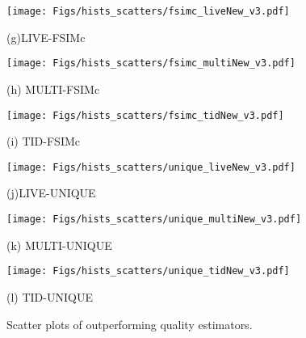 \documentclass[draftcls,12pt, onecolumn]{IEEEtran}
\begin{document}
\begin{center}
\begin{figure}[htbp!]
\begin{minipage}[b]{0.28\linewidth}
  \centering
\texttt{[image: Figs/hists\_scatters/fsimc\_liveNew\_v3.pdf]}
  \vspace{0.03cm}
  \centerline{\footnotesize{(g)LIVE-FSIMc}}\vspace{-0.40cm}
\end{minipage}
 \vspace{0.2cm}
\hfill
\begin{minipage}[b]{0.28\linewidth}
  \centering
\texttt{[image: Figs/hists\_scatters/fsimc\_multiNew\_v3.pdf]}
  \vspace{0.03 cm}
  \centerline{\footnotesize{(h) MULTI-FSIMc   } }\vspace{-0.40cm}
\end{minipage}
 \vspace{0.2cm}
\hfill
\begin{minipage}[b]{0.28\linewidth}
  \centering
\texttt{[image: Figs/hists\_scatters/fsimc\_tidNew\_v3.pdf]}
  \vspace{0.03cm}
  \centerline{\footnotesize{(i) TID-FSIMc }}\vspace{-0.40cm}
\end{minipage}



\begin{minipage}[b]{0.28\linewidth}
  \centering
\texttt{[image: Figs/hists\_scatters/unique\_liveNew\_v3.pdf]}
  \vspace{0.03cm}
  \centerline{\footnotesize{(j)LIVE-UNIQUE}}\vspace{-0.45cm}
\end{minipage}
 \vspace{0.2cm}
\hfill
\begin{minipage}[b]{0.28\linewidth}
  \centering
\texttt{[image: Figs/hists\_scatters/unique\_multiNew\_v3.pdf]}
  \vspace{0.03 cm}
  \centerline{\footnotesize{(k) MULTI-UNIQUE   } }\vspace{-0.45cm}
\end{minipage}
 \vspace{0.2cm}
\hfill
\begin{minipage}[b]{0.28\linewidth}
  \centering
\texttt{[image: Figs/hists\_scatters/unique\_tidNew\_v3.pdf]}
  \vspace{0.03cm}
  \centerline{\footnotesize{(l) TID-UNIQUE }}\vspace{-0.45cm}
\end{minipage}






\caption{Scatter plots of outperforming quality estimators.}\vspace{-.5cm}
\label{fig:Scatter}
\vspace{-2.0mm}
\end{figure}
 \end{center}
\end{document}
